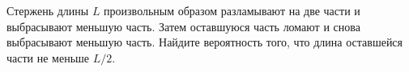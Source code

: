 \documentclass{article}
\begin{document}
Стержень длины $L$ произвольным образом разламывают на две части и выбрасывают меньшую часть. Затем оставшуюся часть ломают и снова выбрасывают меньшую часть. 
Найдите вероятность того, что длина оставшейся части не меньше $L/2$.
\end{document}
